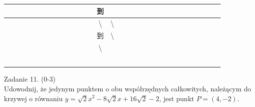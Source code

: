 \documentclass[10pt]{article}
\begin{document}
\begin{center}
\begin{tabular}{|c|c|c|c|c|c|c|c|c|c|c|c|c|c|c|c|c|c|c|c|c|c|c|c|c|c|c|c|c|c|}
\hline
 &  &  &  &  &  &  &  &  &  &  &  &  & 到 &  &  &  &  &  &  &  &  &  &  &  &  &  &  &  &  \\
\hline
 &  &  &  &  &  &  &  &  &  &  &  &  & \textbackslash  & \textbackslash  &  &  &  &  &  &  &  &  &  &  &  &  &  &  &  \\
\hline
 &  &  &  &  &  &  &  &  &  &  &  &  & 到 & \textbackslash  &  &  &  &  &  &  &  &  &  &  &  &  &  &  &  \\
\hline
 &  &  &  &  &  &  &  &  &  &  &  &  & \textbackslash  &  &  &  &  &  &  &  &  &  &  &  &  &  &  &  &  \\
\hline
 &  &  &  &  &  &  &  &  &  &  &  &  &  &  &  &  &  &  &  &  &  &  &  &  &  &  &  &  &  \\
\hline
 &  &  &  &  &  &  &  &  &  &  &  &  &  &  &  &  &  &  &  &  &  &  &  &  &  &  &  &  &  \\
\hline
 &  &  &  &  &  &  &  &  &  &  &  &  &  &  &  &  &  &  &  &  &  &  &  &  &  &  &  &  &  \\
\hline
 &  &  &  &  &  &  &  &  &  &  &  &  &  &  &  &  &  &  &  &  &  &  &  &  &  &  &  &  &  \\
\hline
 &  &  &  &  &  &  &  &  &  &  &  &  &  &  &  &  &  &  &  &  &  &  &  &  &  &  &  &  &  \\
\hline
\end{tabular}
\end{center}

Zadanie 11. (0-3)\\
Udowodnij, że jedynym punktem o obu współrzędnych całkowitych, należącym do krzywej o równaniu \(y=\sqrt{2} x^{2}-8 \sqrt{2} x+16 \sqrt{2}-2\), jest punkt \(P=(4,-2)\).
\end{document}
